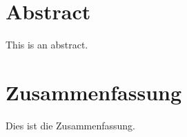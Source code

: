 \documentclass[
	11pt,
	a4paper,
	twoside,
	headsepline,
	titlepage,
	parskip=off
	DIV=11,
	BCOR=12mm,
	captions=tableheading,
	chapterprefix=on,
	numbers=noenddot
]{scrbook}
\begin{document}
    \thispagestyle{headings}
    

    \enlargethispage{1\baselineskip}
    \setcounter{page}{1}

    \chapter*{Abstract}
        This is an abstract.

    \chapter*{Zusammenfassung}
        Dies ist die Zusammenfassung.

    \cleardoublepage

    \tableofcontents
    \cleardoublepage

    
    
    
    

    \printbibliography[heading=bibintoc]
\end{document}
